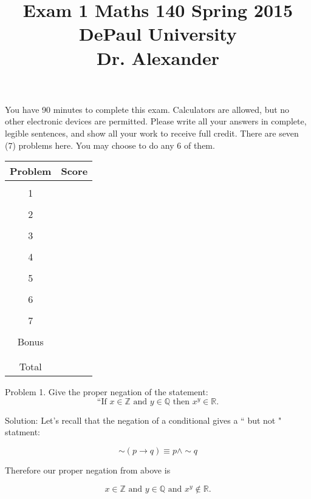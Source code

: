 \documentclass[16 pt]{amsart}
\theoremstyle{definition}
\theoremstyle{remark}
\numberwithin{equation}{subsection}
\newcommand{\R}{\mathbb{R}}
\newcommand{\Z}{\mathbb{Z}}
\newcommand{\Q}{\mathbb{Q}}
\begin{document}
\title{Exam 1 Maths 140 Spring 2015 \\ DePaul University\\Dr. Alexander}
\maketitle
You have 90 minutes to complete this exam.  Calculators are allowed, but no other electronic devices are permitted.  Please write all your answers in complete, legible sentences, and show all your work to receive full credit.  There are seven (7) problems here.  You may choose to do any 6 of them.  
\vspace{1in}


\begin{center}
  \begin{tabular}{ c | c }
    Problem & Score\\
    \hline
    &\\
    1&\\
    &\\
    2&\\
    &\\
    3&\\
    &\\
    4&\\
    &\\
    5&\\
    &\\
    6&\\
    &\\
    7&\\
    &\\
    Bonus&\\
    &\\
    \hline 
    &\\    
    Total& 
 \end{tabular}
\end{center}

\newpage 
Problem 1. Give the proper negation of the statement:
\[
\text{``If } x\in\Z \text{ and } y\in\Q \text{ then } x^y \in \R.
\]


\vspace{1in}

Solution: Let's recall that the negation of a conditional gives a `` but not " statment:

\[
\sim (p\rightarrow q) \equiv p \wedge \sim q
\]

Therefore our proper negation from above is

\[
 x\in\Z \text{ and } y\in\Q \text{ and } x^y \notin \R.
\]
\end{document}
